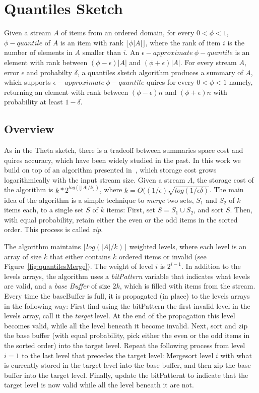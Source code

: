 \section{Quantiles Sketch}
\label{sec:quantiles}


Given a stream $A$ of items from an ordered domain, for every
$0< \phi < 1$, $\phi - quantile$ of $A$ is an item with rank 
$\lfloor \phi |A| \rfloor$, where the rank of item $i$ is the
number of elements in $A$ smaller than $i$.
An $\epsilon -approximate ~\phi - quantile$ is an element
with rank between $ (\phi - \epsilon) |A|$ and $ (\phi +
\epsilon) |A|$.
For every stream $A$, error $\epsilon$ and probabilty $\delta$,
a quantiles sketch algorithm produces a summary of $A$, which
supports $\epsilon -approximate ~\phi - quantile$ quires for
every $0< \phi < 1$ namely, returning an element with rank between $(\phi-\epsilon)n$ and  $(\phi+\epsilon)n$ with probability
at least $1 - \delta$.

\subsection{Overview}
As in the Theta sketch, there
is a tradeoff between summaries space cost and quires accuracy,
which have been widely studied in the past.
In this work we build on top of an algorithm presented
in~\cite{}, which storage cost grows logarithmically with the
input stream size.
Given a stream $A$, the storage cost of the algorithm is
$k*2^{log(\lfloor |A|/k \rfloor)}$, where $k = O((1/\epsilon)
\sqrt{log(1/\epsilon \delta)}$.
The main idea of the algorithm is a simple technique to
\emph{merge} two sets, $S_1$ and $S_2$ of $k$ items each, to a
single set $S$ of $k$ items:
First, set $S = S_1 \cup S_2$, and sort $S$. 
Then, with equal probability, retain either the even or the odd
items in the sorted order. 
This process is called \emph{zip}.


The algorithm maintains $\lfloor log(|A|/k) \rfloor$ weighted
levels, where each level is an array of size $k$ that either contains $k$ ordered
items or invalid (see Figure~\ref{fig:quantilesMerge}).
The weight of level $i$ is $2^{i-1}$.
In addition to the levels arrays, the algorithm uses a
\emph{bitPattern} variable that indicates what levels are valid,
and a \emph{base Buffer} of size $2k$, which is filled with items
from the stream.
Every time the baseBuffer is full, it is propagated (in place) to
the levels arrays in the following way:
First find using the bitPattern the first invalid level in
the levels array, 
call it the \emph{target} level. At the end of
the propagation this level becomes valid, while all the
level beneath it become invalid.
Next, sort and zip the base buffer (with equal probability,
pick either the even or the odd items in the sorted order) into
the target level.
Repeat the following process from level $i=1$ to the
last level that precedes the target level:
Mergesort level $i$ with what is currently stored in the target
level into the base buffer, and then zip the base buffer into the
target level.
Finally, update the bitPatternt to indicate that the target
level is now valid while all the level beneath it are not.

